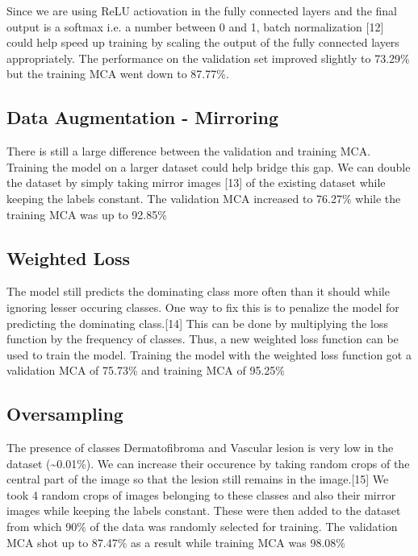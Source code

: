 \documentclass[conference]{IEEEtran}
\begin{document}
Since we are using ReLU actiovation in the fully connected layers and
the final output is a softmax i.e. a number between 0 and 1, batch
normalization {[}12{]} could help speed up training by scaling the
output of the fully connected layers appropriately. The performance on
the validation set improved slightly to 73.29\% but the training MCA
went down to 87.77\%.

\subsection{Data Augmentation -
Mirroring}\label{data-augmentation---mirroring}

There is still a large difference between the validation and training
MCA. Training the model on a larger dataset could help bridge this gap.
We can double the dataset by simply taking mirror images {[}13{]} of the
existing dataset while keeping the labels constant. The validation MCA
increased to 76.27\% while the training MCA was up to 92.85\%

\subsection{Weighted Loss}\label{weighted-loss}

The model still predicts the dominating class more often than it should
while ignoring lesser occuring classes. One way to fix this is to
penalize the model for predicting the dominating class.{[}14{]} This can
be done by multiplying the loss function by the frequency of classes.
Thus, a new weighted loss function can be used to train the model.
Training the model with the weighted loss function got a validation MCA
of 75.73\% and training MCA of 95.25\%

\subsection{Oversampling}\label{oversampling}

The presence of classes Dermatofibroma and Vascular lesion is very low
in the dataset (\textasciitilde{}0.01\%). We can increase their
occurence by taking random crops of the central part of the image so
that the lesion still remains in the image.{[}15{]} We took 4 random
crops of images belonging to these classes and also their mirror images
while keeping the labels constant. These were then added to the dataset
from which 90\% of the data was randomly selected for training. The
validation MCA shot up to 87.47\% as a result while training MCA was
98.08\%
\end{document}
